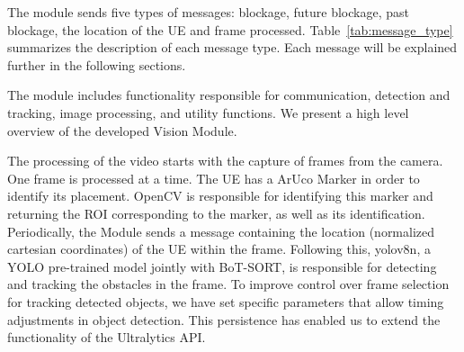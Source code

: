 The module sends five types of messages: blockage, future blockage, past blockage, the location of the UE and frame processed.
Table~\ref{tab:message_type} summarizes the description of each message type.
Each message will be explained further in the following sections.

\begin{table}[H]
    \caption{Summary of each message type}
    \label{tab:message_type}
    \centering
\end{table}

The module includes functionality responsible for communication, detection and tracking, image processing, and utility functions.
We present a high level overview of the developed Vision Module.

The processing of the video starts with the capture of frames from the camera.
One frame is processed at a time.
The UE has a ArUco Marker in order to identify its placement.
OpenCV is responsible for identifying this marker and returning the ROI corresponding to the marker, as well as its identification.
Periodically, the Module sends a message containing the location (normalized cartesian coordinates) of the UE within the frame\@.
Following this, yolov8n, a YOLO pre-trained model jointly with BoT-SORT, is responsible for detecting and tracking the obstacles in the frame.
To improve control over frame selection for tracking detected objects, we have set specific parameters that allow timing adjustments in object detection.
This persistence has enabled us to extend the functionality of the Ultralytics API\@.

